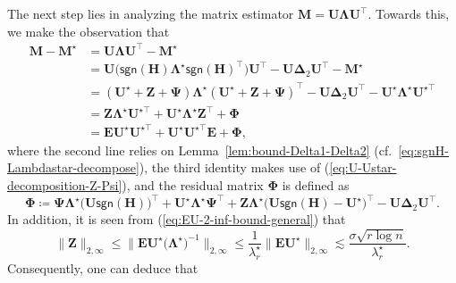The next step lies in analyzing the matrix estimator $\bm{M}=\bm{U}\bm{\Lambda}\bm{U}^{\top}$.
Towards this, we make the observation that
%
\begin{align}
\bm{M}-\bm{M}^{\star} & =\bm{U}\bm{\Lambda}\bm{U}^{\top}-\bm{M}^{\star}\nonumber \\
 & =\bm{U}\big(\mathsf{sgn}(\bm{H})\bm{\Lambda}^{\star}\mathsf{sgn}(\bm{H})^{\top}\big)\bm{U}^{\top}-\bm{U}\bm{\Delta}_{2}\bm{U}^{\top}-\bm{M}^{\star}\nonumber \\
 & =(\bm{U}^{\star}+\bm{Z}+\bm{\Psi})\bm{\Lambda}^{\star}(\bm{U}^{\star}+\bm{Z}+\bm{\Psi})^{\top}-\bm{U}\bm{\Delta}_{2}\bm{U}^{\top}-\bm{U}^{\star}\bm{\Lambda}^{\star}\bm{U}^{\star\top}\nonumber \\
 & =\bm{Z}\bm{\Lambda}^{\star}\bm{U}^{\star\top}+\bm{U}^{\star}\bm{\Lambda}^{\star}\bm{Z}^{\top}+\bm{\Phi}\nonumber \\
 & =\bm{E}\bm{U}^{\star}\bm{U}^{\star\top}+\bm{U}^{\star}\bm{U}^{\star\top}\bm{E}+\bm{\Phi},\label{eq:M-Mstar-diff-decomposition}
\end{align}
%
where the second line relies on Lemma~\ref{lem:bound-Delta1-Delta2} (cf.~\eqref{eq:sgnH-Lambdastar-decompose}),
the third identity makes use of (\ref{eq:U-Ustar-decomposition-Z-Psi}),
and the residual matrix $\bm{\Phi}$ is defined as
%
\begin{equation}
\bm{\Phi}\coloneqq\bm{\Psi}\bm{\Lambda}^{\star}\big(\bm{U}\mathsf{sgn}(\bm{H})\big)^{\top}+\bm{U}^{\star}\bm{\Lambda}^{\star}\bm{\Psi}^{\top}+\bm{Z}\bm{\Lambda}^{\star}\big(\bm{U}\mathsf{sgn}(\bm{H})-\bm{U}^{\star}\big)^{\top}-\bm{U}\bm{\Delta}_{2}\bm{U}^{\top}.\label{eq:defn-Phi-residual}
\end{equation}
%
In addition, it is seen from (\ref{eq:EU-2-inf-bound-general}) that
%
\begin{equation}
\|\bm{Z}\|_{2,\infty}\leq\big\|\bm{E}\bm{U}^{\star}\big(\bm{\Lambda}^{\star}\big)^{-1}\big\|_{2,\infty}\leq\frac{1}{\lambda_{r}^{\star}}\big\|\bm{E}\bm{U}^{\star}\big\|_{2,\infty}\lesssim\frac{\sigma\sqrt{r\log n}}{\lambda_{r}^{\star}}.\label{eq:Z-two-inf-norm-bound}
\end{equation}
%
Consequently, one can deduce that
%
